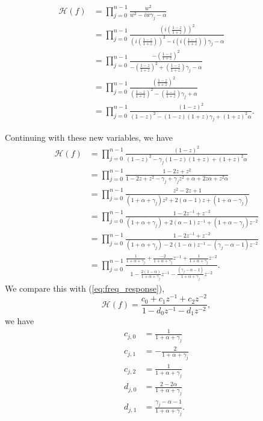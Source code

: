\documentclass[a4paper]{article}
\begin{document}
\begin{align}
    \mathcal{H}(f) &= \prod_{j=0}^{n - 1}\frac{w^2}
        {w^2 - i w \gamma_j - \alpha} \\
    &= \prod_{j=0}^{n - 1}\frac{\left(i\left(\frac{1 - z}{1 + z}\right)\right)^2}
        {\left(i\left(\frac{1 - z}{1 + z}\right)\right)^2 - i \left(i\left(\frac{1 - z}{1 + z}\right)\right) \gamma_j - \alpha} \\
    &= \prod_{j=0}^{n - 1}\frac{-\left(\frac{1 - z}{1 + z}\right)^2}
        {-\left(\frac{1 - z}{1 + z}\right)^2 +  \left(\frac{1 - z}{1 + z}\right) \gamma_j - \alpha} \\
    &= \prod_{j=0}^{n - 1}\frac{\left(\frac{1 - z}{1 + z}\right)^2}
        {\left(\frac{1 - z}{1 + z}\right)^2 -  \left(\frac{1 - z}{1 + z}\right) \gamma_j +  \alpha} \\
    &= \prod_{j=0}^{n - 1}\frac{(1 - z)^2}
        {(1 - z)^2 - (1 - z)(1 + z) \gamma_j + (1 + z)^2 \alpha}.
\end{align}

Continuing with these new variables, we have
\begin{align}
    \mathcal{H}(f) &= \prod_{j=0}^{n - 1}\frac{(1 - z)^2}
        {(1 - z)^2 - \gamma_j (1 - z)(1 + z) + (1 + z)^2 \alpha} \\
    &= \prod_{j=0}^{n - 1}\frac{1 - 2z + z^2}
        {1 - 2z + z^2 - \gamma_j + \gamma_j z^2 + \alpha + 2z \alpha + z^2 \alpha} \\
    &= \prod_{j=0}^{n - 1}\frac{z^2 - 2z + 1}
        {(1 + \alpha + \gamma_j)z^2 + 2(\alpha - 1) z + (1 + \alpha - \gamma_j)} \\
    &= \prod_{j=0}^{n - 1}\frac{1 - 2z^{-1} + z^{-2}}
        {(1 + \alpha + \gamma_j) + 2(\alpha - 1) z^{-1} + (1 + \alpha - \gamma_j) z^{-2}} \\
        &= \prod_{j=0}^{n - 1}\frac{1 - 2z^{-1} + z^{-2}}
        {(1 + \alpha + \gamma_j) - 2(1 - \alpha) z^{-1} - (\gamma_j - \alpha - 1)z^{-2}}\\
        &= \prod_{j=0}^{n - 1}\frac{\frac{1}{1 + \alpha + \gamma_j} + \frac{-2}{1 + \alpha + \gamma_j}z^{-1} + \frac{1}{1 + \alpha + \gamma_j}z^{-2}}
        {1 - \frac{2(1 - \alpha)}{1 + \alpha + \gamma_j} z^{-1} - \frac{(\gamma_j - \alpha - 1)}{1 + \alpha + \gamma_j}z^{-2}}.
\end{align}
We compare this with (\ref{eq:freq_response}),
\begin{equation*}
\mathcal{H}(f) = \frac{c_0 + c_1 z^{-1} + c_2 z^{-2}}{1 - d_0 z^{-1} - d_1 z^{-2}},
\end{equation*}
we have
\begin{align}
    c_{j,0} &= \frac{1}{1 + \alpha + \gamma_j} \\
    c_{j,1} &= -\frac{2}{1 + \alpha + \gamma_j} \\
    c_{j,2} &= \frac{1}{1 + \alpha + \gamma_j} \\
    d_{j,0} &= \frac{2-2\alpha}{1 + \alpha + \gamma_j} \\
    d_{j,1} &= \frac{\gamma_j - \alpha - 1}{1 + \alpha + \gamma_j}.
\end{align}
\end{document}
